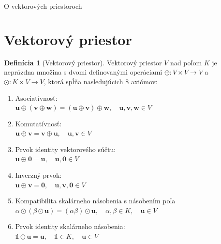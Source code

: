\documentclass[a4paper, 10pt, ]{article}
\newcommand{\bm}[1]{\mathbf{#1}}
\theoremstyle{definition}
\newtheorem{definition}{Definícia}[section]
\begin{document}
\begin{flushleft}
    O vektorových priestoroch
\end{flushleft}

\bigskip

\normalsize
\normalfont

\section{Vektorový priestor}
\label{VectorSpace}

\begin{definition}[Vektorový priestor]
    \label{VectorSpace.Definition:VectorSpace}
    Vektorový priestor $V$ nad poľom $K$ je neprázdna množina s dvomi definovanými operáciami $\oplus: V \times V \rightarrow V$  a $\odot: K \times V \rightarrow V$, ktorá spĺňa nasledujúcich 8 axiómov:
    \begin{enumerate}
        \TabPositions{1cm}
        \item Asociatívnosť: \\
        \tab\tab $\bm{u} \oplus (\bm{v} \oplus \bm{w}) = (\bm{u} \oplus \bm{v}) \oplus \bm{w}, \quad \bm{u}, \bm{v}, \bm{w} \in V$
        
        \item Komutatívnosť: \\
        \tab\tab $\bm{u} \oplus \bm{v} = \bm{v} \oplus \bm{u}, \quad \bm{u}, \bm{v} \in V$
        
        \item Prvok identity vektorového súčtu: \\
        \tab\tab $\bm{u} \oplus \bm{0} = \bm{u}, \quad \bm{u}, \bm{0} \in V$
        
        \item Inverzný prvok: \\
        \tab\tab $\bm{u} \oplus \bm{v} = \bm{0}, \quad \bm{u}, \bm{v}, \bm{0} \in V$
        
        \item Kompatibilita skalárneho násobenia s násobením poľa \\
        \tab\tab $\alpha \odot (\beta \odot \bm{u}) = (\alpha \beta) \odot \bm{u}, \quad \alpha, \beta \in K, \quad \bm{u} \in V$
        
        \item Prvok identity skalárneho násobenia: \\
        \tab\tab $\mathbb{1} \odot \bm{u} = \bm{u}, \quad \mathbb{1} \in K, \quad \bm{u} \in V$
        

\end{enumerate}
\end{definition}
\end{document}
